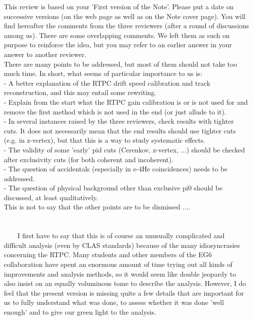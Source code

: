 
This review is based on your 'First version of the Note'. Please put a date on 
successive versions (on the web page as well as on the Note cover page). You 
will find hereafter the comments from the three reviewers (after a round of 
discussions among us). There are some overlapping comments. We left them as 
such on purpose to reinforce the idea, but you may refer to an earlier answer 
in your answer to another reviewer.\\

There are many points to be addressed, but most of them should not take too 
much time. In short, what seems of particular importance to us is:\\
- A better explanation of the RTPC drift speed calibration and track 
reconstruction, and this may entail some rewriting.\\
- Explain from the start what the RTPC gain calibration is or is not used for 
and remove the first method which is not used in the end (or just allude to 
it).\\
- In several instances raised by the three reviewers, check results with 
tighter cuts. It does not necessarily mean that the end results should use 
tighter cuts (e.g. in z-vertex), but that this is a way to study systematic 
effects.\\
- The validity of some 'early' pid cuts (Cerenkov, z-vertex, ...) should be 
checked after exclusivity cuts (for both coherent and incoherent).\\
- The question of accidentals (especially in e-4He coincidences) needs to be 
addressed.\\
- The question of physical background other than exclusive pi0 should be 
discussed, at least qualitatively.\\
This is not to say that the other points are to be dismissed ....

\section*{}

~~~~I first have to say that this is of course an unusually complicated and 
difficult analysis (even by CLAS standards) because of the many idiosyncrasies 
concerning the RTPC. Many students and other members of the EG6 collaboration 
have spent an enormous amount of time trying out all kinds of improvements and 
analysis methods, so it would seem like double jeopardy to also insist on an 
equally voluminous tome to describe the analysis. However, I do feel that the 
present version is missing quite a few details that are important for us to 
fully understand what was done, to assess whether it was done 'well enough' and 
to give our green light to the analysis.\\



